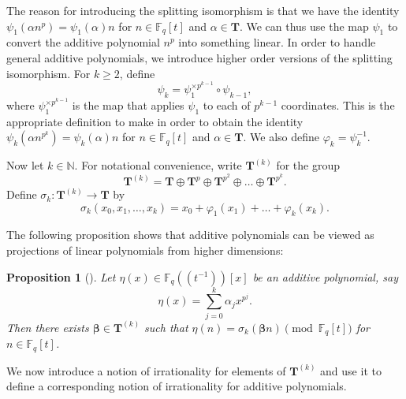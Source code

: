 \documentclass{amsart}
\newtheorem{proposition}[theorem]{Proposition}
\theoremstyle{definition}
\numberwithin{equation}{section}
\newcommand{\N}{\mathbb{N}}
\newcommand{\F}{\mathbb{F}}
\begin{document}
The reason for introducing the splitting isomorphism is that we have the identity $\psi_1(\alpha n^p) = \psi_1(\alpha)n$ for $n \in \F_q[t]$ and $\alpha \in \mathbf{T}$.
We can thus use the map $\psi_1$ to convert the additive polynomial $n^p$ into something linear.
In order to handle general additive polynomials, we introduce higher order versions of the splitting isomorphism.
For $k \ge 2$, define
\begin{equation*}
    \psi_k = \psi_1^{\times p^{k-1}} \circ \psi_{k-1},
\end{equation*}
where $\psi_1^{\times p^{k-1}}$ is the map that applies $\psi_1$ to each of $p^{k-1}$ coordinates.
This is the appropriate definition to make in order to obtain the identity $\psi_k(\alpha n^{p^k}) = \psi_k(\alpha) n$ for $n \in \F_q[t]$ and $\alpha \in \mathbf{T}$.
We also define $\varphi_k = \psi_k^{-1}$.

Now let $k \in \N$.
For notational convenience, write $\mathbf{T}^{(k)}$ for the group
\begin{equation*}
    \mathbf{T}^{(k)} = \mathbf{T} \oplus \mathbf{T}^p \oplus \mathbf{T}^{p^2} \oplus \ldots \oplus \mathbf{T}^{p^k}.
\end{equation*}
Define $\sigma_k : \mathbf{T}^{(k)} \to \mathbf{T}$ by
\begin{equation*}
    \sigma_k(x_0, x_1, \ldots, x_k) = x_0 + \varphi_1(x_1) + \ldots + \varphi_k(x_k).
\end{equation*}

The following proposition shows that additive polynomials can be viewed as projections of linear polynomials from higher dimensions:

\begin{proposition}[{\cite[Proposition 7.1]{bl}}] \label{prop: additive linear representation}
    Let $\eta(x) \in \F_q((t^{-1}))[x]$ be an additive polynomial, say
    \begin{equation*}
        \eta(x) = \sum_{j=0}^k \alpha_j x^{p^j}.
    \end{equation*}
    Then there exists $\bm{\beta} \in \mathbf{T}^{(k)}$ such that $\eta(n) = \sigma_k(\bm{\beta} n) \pmod{\F_q[t]}$ for $n \in \F_q[t]$.
\end{proposition}

We now introduce a notion of irrationality for elements of $\mathbf{T}^{(k)}$ and use it to define a corresponding notion of irrationality for additive polynomials.
\end{document}
